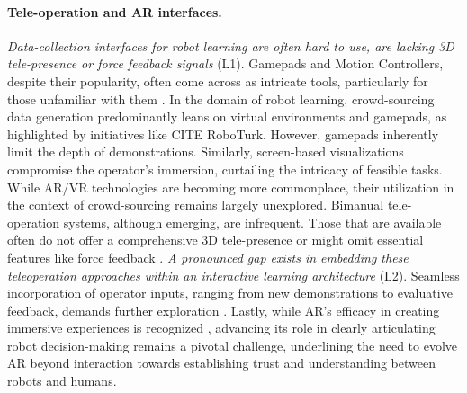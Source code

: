 \begin{refsection}
\paragraph{Tele-operation and AR interfaces.} \textit{Data-collection interfaces for robot learning are often hard to use, are lacking 3D tele-presence or force feedback signals} (L1). Gamepads and Motion Controllers, despite their popularity, often come across as intricate tools, particularly for those unfamiliar with them \cite{Bushman_Asselmeier_Won_LaViers_2020}. In the domain of robot learning, crowd-sourcing data generation predominantly leans on virtual environments and gamepads, as highlighted by initiatives like CITE RoboTurk. However, gamepads inherently limit the depth of demonstrations. Similarly, screen-based visualizations compromise the operator's immersion, curtailing the intricacy of feasible tasks. While AR/VR technologies are becoming more commonplace, their utilization in the context of crowd-sourcing remains largely unexplored. Bimanual tele-operation systems, although emerging, are infrequent. Those that are available often do not offer a comprehensive 3D tele-presence or might omit essential features like force feedback \cite{Lipton_Fay_Rus_2018,DelPreto_Lipton_Sanneman_Fay_Fourie_Choi_Rus_2020,Jang_Niu_Collins_Weightman_Carrasco_Lennox_2021}.
\textit{A pronounced gap exists in embedding these teleoperation approaches within an interactive learning architecture} (L2). Seamless incorporation of operator inputs, ranging from new demonstrations to evaluative feedback, demands further exploration \cite{Hedlund_Johnson_Gombolay_2021,Moorman_Hedlund-Botti_Schrum_Natarajan_Gombolay_2023}. Lastly, while AR's efficacy in creating immersive experiences is recognized \cite{Mullen_Mosier_Chakrabarti_Chen_White_Losey_2021, Rosen_Whitney_Phillips_Chien_Tompkin_Konidaris_Tellex_2020}, advancing its role in clearly articulating robot decision-making remains a pivotal challenge, underlining the need to evolve AR beyond interaction towards establishing trust and understanding between robots and humans.
\vspace{-0.3cm}

\end{refsection}
